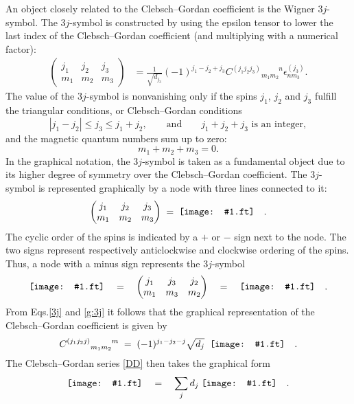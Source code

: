 \documentclass[graybox, secnum]{svmult}
\makeatletter
\newcommand{\ft}{pdf}        %
\newcommand{\makeSymbol}[1]{\mathord{\vcenter{\hbox{#1}}}}
\newcommand{\Symbol}[1]{\makeSymbol{\texttt{[image: \#1.\\ft]}}}
\newcommand{\Eqs}[1]{Eqs.\@\xspace\eqref{#1}}
\newcommand{\downup}[2]{_{#1}^{\phantom{#1}#2}}
\newcommand{\idx}[1]{#1}
\newcommand{\CG}[4]{C^{(#1#2)}{}\downup{#3}{#4}}
\newcommand{\threej}[6]{\begin{pmatrix} #1&#2&#3 \\ #4&#5&#6 \end{pmatrix}}
\makeatother
\begin{document}
An object closely related to the Clebsch--Gordan coefficient is the Wigner \idx{$3j$-symbol}. The $3j$-symbol is constructed by using the epsilon tensor to lower the last index of the Clebsch--Gordan coefficient (and multiplying with a numerical factor):
\begin{align}
	\threej{j_1}{j_2}{j_3}{m_1}{m_2}{m_3} &= \frac{1}{\sqrt{d_{j_3}}}(-1)^{j_1-j_2+j_3}\CG{j_1j_2}{j_3}{m_1m_2}{n}\epsilon^{(j_3)}_{nm_3}. %
	\label{3j}
\end{align}
The value of the $3j$-symbol is nonvanishing only if the spins $j_1$, $j_2$ and $j_3$ fulfill the triangular conditions, or Clebsch--Gordan conditions
\begin{equation}
	|j_1 - j_2| \leq j_3 \leq j_1 + j_2, \qquad \text{and} \qquad j_1 + j_2 + j_3 \text{ is an integer},
	\label{}
\end{equation}
and the magnetic quantum numbers sum up to zero:
\begin{equation}
	m_1 + m_2 + m_3 = 0.
	\label{}
\end{equation}
In the graphical notation, the $3j$-symbol is taken as a fundamental object due to its higher degree of symmetry over the Clebsch--Gordan coefficient. The $3j$-symbol is represented graphically by a node with three lines connected to it:
\begin{equation}
	\threej{j_1}{j_2}{j_3}{m_1}{m_2}{m_3}\; = \;\Symbol{3j} \quad .
	\label{g:3j}
\end{equation}
The cyclic order of the spins is indicated by a $+$ or $-$ sign next to the node. The two signs represent respectively anticlockwise and clockwise ordering of the spins. Thus, a node with a minus sign represents the $3j$-symbol
\begin{equation}
	\Symbol{3j-minus} \quad = \quad \threej{j_1}{j_3}{j_2}{m_1}{m_3}{m_2} \quad = \quad \Symbol{3j-132} \quad .
	\label{}
\end{equation}
From \Eqs{3j} and \eqref{g:3j} it follows that the graphical representation of the Clebsch--Gordan coefficient is given by
\begin{equation}
	\CG{j_1j_2}{j}{m_1m_2}{m} \; = \; (-1)^{j_1-j_2-j}\sqrt{d_j}\;\;\Symbol{clebsch} \quad . 
	\label{}
\end{equation}
The Clebsch--Gordan series \eqref{DD} then takes the graphical form
\begin{equation}
	\Symbol{DD-clebsch} \quad = \quad \sum_j d_j\;\Symbol{CDC} \quad .
	\label{g:DD}
\end{equation}
\end{document}
